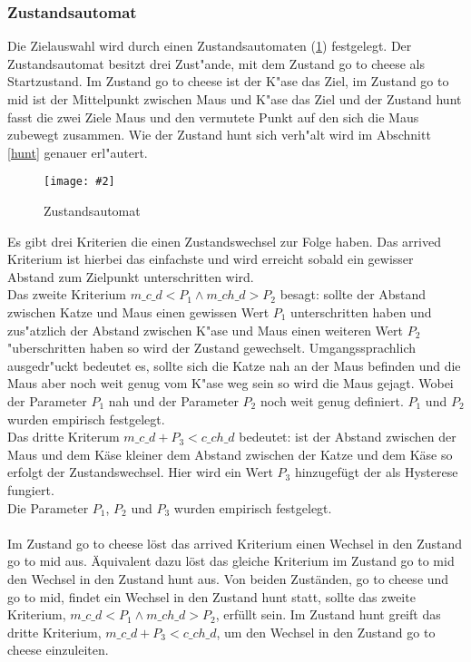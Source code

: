 \documentclass[
a4paper,     %
12pt         %
]{scrartcl}  %
\newcommand{\mygraphics}[3]{
\begin{figure}[!h]
  \begin{center}
    \texttt{[image: \#2]} \\
    \caption{#3}\label{fig:#2}
  \end{center}
\end{figure}

}
\begin{document}
\subsubsection{Zustandsautomat}
Die Zielauswahl wird durch einen Zustandsautomaten (\ref{fig:stateMachine.png}) festgelegt.
Der Zustandsautomat besitzt drei Zust"ande, mit dem Zustand \glqq go to cheese\grqq{} als Startzustand. Im Zustand \glqq go to cheese\grqq{} ist der K"ase das Ziel, im Zustand \glqq go to mid\grqq{} ist der Mittelpunkt zwischen Maus und K"ase das Ziel und der Zustand \glqq hunt\grqq{} fasst die zwei Ziele Maus und den vermutete Punkt auf den sich die Maus zubewegt zusammen. Wie der Zustand \glqq hunt\grqq{} sich verh"alt wird im Abschnitt \ref{hunt} genauer erl"autert.\\
\hspace*{0.63\textwidth}
\mygraphics{0.7\textwidth}{stateMachine.png}{Zustandsautomat}
\noindent Es gibt drei Kriterien die einen Zustandswechsel zur Folge haben. Das \glqq arrived\grqq{} Kriterium ist hierbei das einfachste und wird erreicht sobald ein gewisser Abstand zum Zielpunkt unterschritten wird.\\
Das zweite Kriterium \glqq$m\_c\_d < P_{1} \land  m\_ch\_d > P_{2} $\grqq{} besagt: sollte der Abstand zwischen Katze und Maus einen gewissen Wert $P_{1}$ unterschritten haben und zus"atzlich der Abstand zwischen K"ase und Maus einen weiteren Wert $P_{2}$ "uberschritten haben so wird der Zustand gewechselt. Umgangssprachlich ausgedr"uckt bedeutet es, sollte sich die Katze nah an der Maus befinden und die Maus aber noch weit genug vom K"ase weg sein so wird die Maus gejagt. Wobei der Parameter $P_{1}$ \glqq nah \grqq{} und der Parameter $P_{2}$ \glqq noch weit genug\grqq{} definiert. 
$P_{1}$ und $P_{2}$ wurden empirisch festgelegt.\\
Das dritte Kriterum \glqq $m\_c\_d + P_{3} < c\_ch\_d$\grqq{} bedeutet: ist der Abstand zwischen der Maus und dem Käse kleiner dem Abstand zwischen der Katze und dem Käse so erfolgt der Zustandswechsel. Hier wird ein Wert $P_{3}$ hinzugefügt der als Hysterese fungiert.\\
Die Parameter $P_{1}$, $P_{2}$ und $P_{3}$ wurden empirisch festgelegt.\\
\\\clearpage
\noindent Im Zustand \glqq go to cheese\grqq{} löst das \glqq arrived\grqq{} Kriterium einen Wechsel in den Zustand \glqq go to mid\grqq{} aus. Äquivalent dazu löst das gleiche Kriterium im Zustand \glqq go to mid\grqq{} den Wechsel in den Zustand \glqq hunt\grqq{} aus.
Von beiden Zuständen, \glqq go to cheese\grqq{} und \glqq go to mid\grqq{}, findet ein Wechsel in den Zustand \glqq hunt\grqq{} statt, sollte das zweite Kriterium, \glqq$m\_c\_d < P_{1} \land  m\_ch\_d > P_{2} $\grqq{}, erfüllt sein. Im Zustand \glqq hunt\grqq{} greift das dritte Kriterium, \glqq $m\_c\_d + P_{3} < c\_ch\_d$\grqq{}, um den Wechsel in den Zustand \glqq go to cheese\grqq{} einzuleiten.
\end{document}
